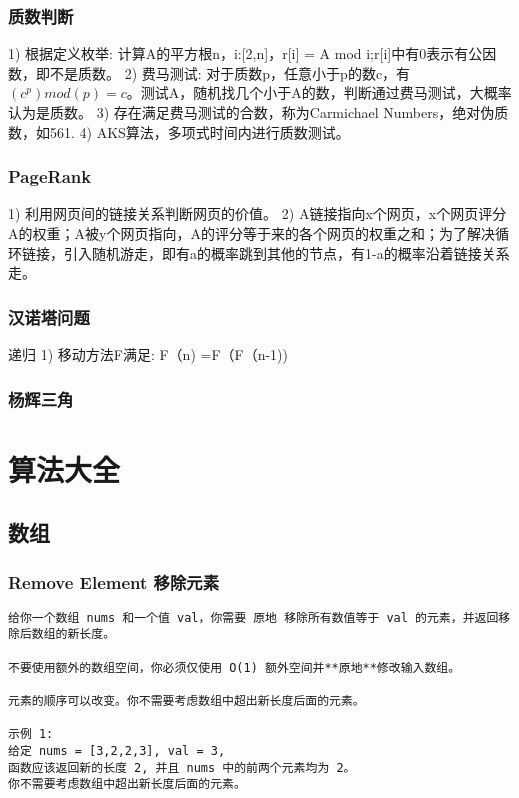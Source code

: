\documentclass[UTF8]{../computerUniverse}
\begin{document}
\subsection{质数判断}
1) 根据定义枚举: 计算A的平方根n，i:[2,n]，r[i] = A mod i;r[i]中有0表示有公因数，即不是质数。
2) 费马测试: 对于质数p，任意小于p的数c，有$(c^p)mod(p) = c$。测试A，随机找几个小于A的数，判断通过费马测试，大概率认为是质数。
3) 存在满足费马测试的合数，称为Carmichael Numbers，绝对伪质数，如561.
4) AKS算法，多项式时间内进行质数测试。


\subsection{PageRank}
1) 利用网页间的链接关系判断网页的价值。
2) A链接指向x个网页，x个网页评分A的权重；A被y个网页指向，A的评分等于来的各个网页的权重之和；为了解决循环链接，引入随机游走，即有a的概率跳到其他的节点，有1-a的概率沿着链接关系走。


\subsection{汉诺塔问题}
递归
1) 移动方法F满足: F（n) =F（F（n-1))


\subsection{杨辉三角}


\chapter{算法大全}


\section{数组}
\subsection{Remove Element  移除元素}

\begin{lstlisting}
给你一个数组 nums 和一个值 val，你需要 原地 移除所有数值等于 val 的元素，并返回移除后数组的新长度。

不要使用额外的数组空间，你必须仅使用 O(1) 额外空间并**原地**修改输入数组。

元素的顺序可以改变。你不需要考虑数组中超出新长度后面的元素。

示例 1:
给定 nums = [3,2,2,3], val = 3,
函数应该返回新的长度 2, 并且 nums 中的前两个元素均为 2。
你不需要考虑数组中超出新长度后面的元素。

\end{lstlisting}
\end{document}
